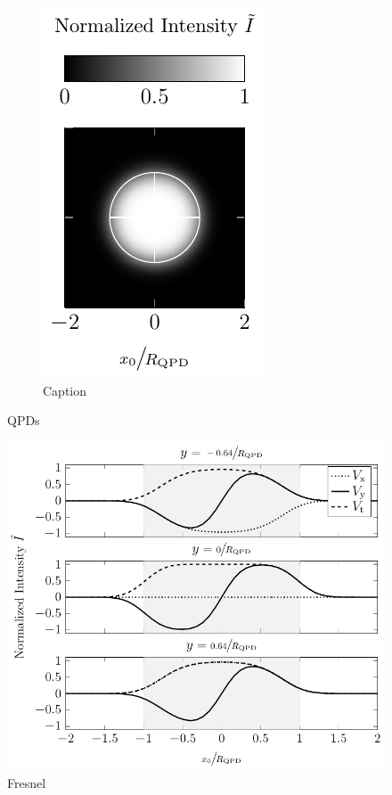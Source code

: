 \begin{figure}
\begin{subfigure}[b]{0.3\textwidth}
    \label{fig:Th-QPDy}
  \end{subfigure}
  \hfill
  \begin{subfigure}[b]{0.3\textwidth}
    \centering
    \includegraphics[]{Plots/cache/QPDt.pdf}
    \caption{Caption}
    \label{fig:Th-QPDt}
  \end{subfigure}
  \caption{QPDs}
  \label{fig:QPDs}
\end{figure}


\begin{figure}[tbp]
  \centering
  \includegraphics[]{Plots/cache/voltages_over_x.pdf}
  \caption{Fresnel}
  \label{fig:Th-voltages_over_x}
\end{figure}


